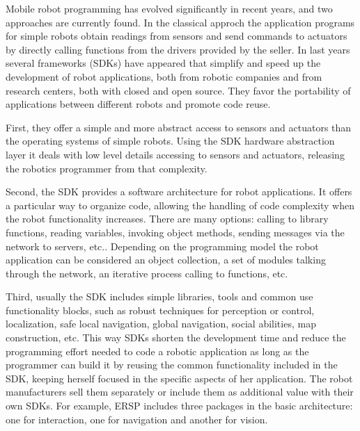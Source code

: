 \documentclass[twocolumn]{svjour3}          %
\begin{document}
Mobile robot programming has evolved significantly in recent years, and two approaches are currently found. In the classical approch the application programs for simple robots obtain readings from sensors and send commands to actuators by directly calling functions from the drivers provided by the seller. In last years several frameworks (SDKs) have appeared that simplify and speed up the development of robot applications, both from robotic companies and from research centers, both with closed and open source. They favor the portability of applications between different robots and promote code reuse.

First, they offer a simple and more abstract access to sensors and actuators than the operating systems of simple robots. Using the SDK hardware abstraction layer it deals with low level details accessing to sensors and actuators, releasing the robotics programmer from that complexity.

Second, the SDK provides a software architecture for robot applications. It offers a particular way to organize code, allowing the handling of code complexity when the robot functionality increases. There are many options: calling to library functions, reading variables, invoking object methods, sending messages via the network to servers, etc.. Depending on the programming model the robot application can be considered an object collection, a set of modules talking through the network, an iterative process calling to functions, etc.

Third, usually the SDK includes simple libraries, tools and common use functionality blocks, such as robust techniques for perception or control, localization, safe local navigation, global navigation, social abilities, map construction, etc. This way SDKs shorten the development time and reduce the programming effort needed to code a robotic application as long as the programmer can build it by reusing the common functionality included in the SDK, keeping herself focused in the specific aspects of her application. The robot manufacturers sell them separately or include them as additional value with their own SDKs. For example, ERSP includes three packages in the basic architecture: one for interaction, one for navigation and another for vision. 
\end{document}
